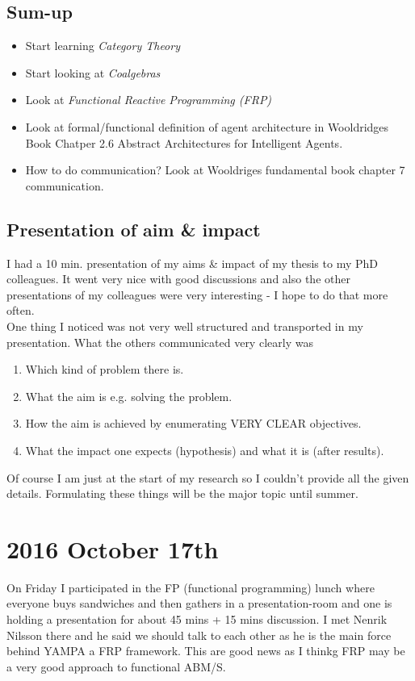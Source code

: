 \subsection*{Sum-up}
\begin{itemize}
\item Start learning \textit{Category Theory}
\item Start looking at \textit{Coalgebras}
\item Look at \textit{Functional Reactive Programming (FRP)}
\item Look at formal/functional definition of agent architecture in Wooldridges Book Chatper 2.6 Abstract Architectures for Intelligent Agents. 
\item How to do communication? Look at Wooldriges fundamental book chapter 7 communication.
\end{itemize}

\subsection*{Presentation of aim \& impact}
I had a 10 min. presentation of my aims \& impact of my thesis to my PhD colleagues. It went very nice with good discussions and also the other presentations of my colleagues were very interesting - I hope to do that more often. \\
One thing I noticed was not very well structured and transported in my presentation. What the others communicated very clearly was

\begin{enumerate}
\item Which kind of problem there is.
\item What the aim is e.g. solving the problem.
\item How the aim is achieved by enumerating VERY CLEAR objectives.
\item What the impact one expects (hypothesis) and what it is (after results).
\end{enumerate}

Of course I am just at the start of my research so I couldn't provide all the given details. Formulating these things will be the major topic until summer.

\section*{2016 October 17th}
On Friday I participated in the FP (functional programming) lunch where everyone buys sandwiches and then gathers in a presentation-room and one is holding a presentation for about 45 mins + 15 mins discussion. I met Nenrik Nilsson there and he said we should talk to each other as he is the main force behind YAMPA a FRP framework. This are good news as I thinkg FRP may be a very good approach to functional ABM/S. 

